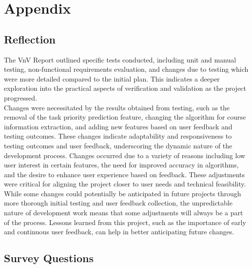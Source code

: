 \documentclass[12pt, titlepage]{article}
\begin{document}
\newpage{}
\section*{Appendix}

\subsection{Reflection}
The VnV Report outlined specific tests conducted, including unit and manual testing, non-functional requirements evaluation, and changes due to testing which were more detailed compared to the initial plan. This indicates a deeper exploration into the practical aspects of verification and validation as the project progressed. \\
Changes were necessitated by the results obtained from testing, such as the removal of the task priority prediction feature, changing the algorithm for course information extraction, and adding new features based on user feedback and testing outcomes. These changes indicate adaptability and responsiveness to testing outcomes and user feedback, underscoring the dynamic nature of the development process. Changes occurred due to a variety of reasons including low user interest in certain features, the need for improved accuracy in algorithms, and the desire to enhance user experience based on feedback. These adjustments were critical for aligning the project closer to user needs and technical feasibility.\\
While some changes could potentially be anticipated in future projects through more thorough initial testing and user feedback collection, the unpredictable nature of development work means that some adjustments will always be a part of the process. Lessons learned from this project, such as the importance of early and continuous user feedback, can help in better anticipating future changes.

\subsection{Survey Questions}\label{survey}
\end{document}
